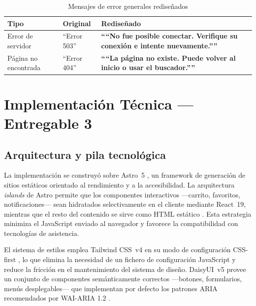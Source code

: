 \documentclass[conference]{IEEEtran}
\newcommand{\buenEjemplo}[1]{\textcolor{colorBueno}{\textbf{``#1''}}}
\begin{document}
\begin{table}[H]
\centering
\caption{Mensajes de error generales rediseñados}
\label{tab:errores-generales}
\setlength{\tabcolsep}{3pt}
\renewcommand{\arraystretch}{1.2}
\begin{tabular}{|p{1.8cm}|p{2.2cm}|p{3cm}|}
\hline
\textbf{Tipo} & \textbf{Original} & \textbf{Rediseñado} \\
\hline
Error de servidor & ``Error 503'' & \buenEjemplo{``No fue posible conectar. Verifique su conexión e intente nuevamente.''} \\
\hline
Página no encontrada & ``Error 404'' & \buenEjemplo{``La página no existe. Puede volver al inicio o usar el buscador.''} \\
\hline
\end{tabular}
\end{table}

\section{Implementación Técnica — Entregable 3}

\subsection{Arquitectura y pila tecnológica}

La implementación se construyó sobre Astro~5 \cite{astro-docs}, un framework de generación de sitios estáticos orientado al rendimiento y a la accesibilidad. La arquitectura \textit{islands} de Astro permite que los componentes interactivos —carrito, favoritos, notificaciones— sean hidratados selectivamente en el cliente mediante React~19, mientras que el resto del contenido se sirve como HTML estático \cite{astro-docs}. Esta estrategia minimiza el JavaScript enviado al navegador y favorece la compatibilidad con tecnologías de asistencia.

El sistema de estilos emplea Tailwind CSS~v4 en su modo de configuración CSS-first \cite{tailwind-docs}, lo que elimina la necesidad de un fichero de configuración JavaScript y reduce la fricción en el mantenimiento del sistema de diseño. DaisyUI~v5 \cite{daisyui-docs} provee un conjunto de componentes semánticamente correctos —botones, formularios, menús desplegables— que implementan por defecto los patrones ARIA recomendados por WAI-ARIA 1.2 \cite{wai-aria}.
\end{document}
